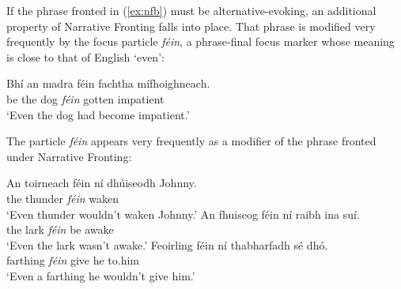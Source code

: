 \documentclass[output=paper,colorlinks,citecolor=brown]{langscibook}
\begin{document}
\noindent If the phrase fronted in (\ref{ex:nfb}) must be alternative-evoking, an additional property of Narrative Fronting falls into place. That phrase is modified very frequently by the focus particle {\itshape féin}, a phrase-final focus marker whose meaning is close to that of English `even':

\ea
\gll Bhí an madra féin fachtha mífhoighneach. \\
     {be\past} the dog {\itshape féin} gotten impatient \\
\glt `Even the dog had become impatient.'
\z


The particle \textit{féin} appears very frequently as a modifier of the phrase fronted under Narrative Fronting:

\ea\label{ex:fein.fronting}
\ea
\gll An toirneach féin ní dhúiseodh Johnny. \\
     the thunder {\itshape féin} {\no} {waken\cond} {} \\
\glt `Even thunder wouldn't waken Johnny.'
\ex
\gll An fhuiseog féin ní raibh {ina suí}. \\
     the lark {\itshape féin} {\no} {be\past} awake \\
\glt `Even the lark wasn't awake.'
\ex
\gll Feoirling féin ní thabharfadh sé dhó. \\
     farthing {\itshape féin} {\no} {give\cond} he to.him \\
\glt `Even a farthing he wouldn't give him.'
\z
\z

\end{document}
